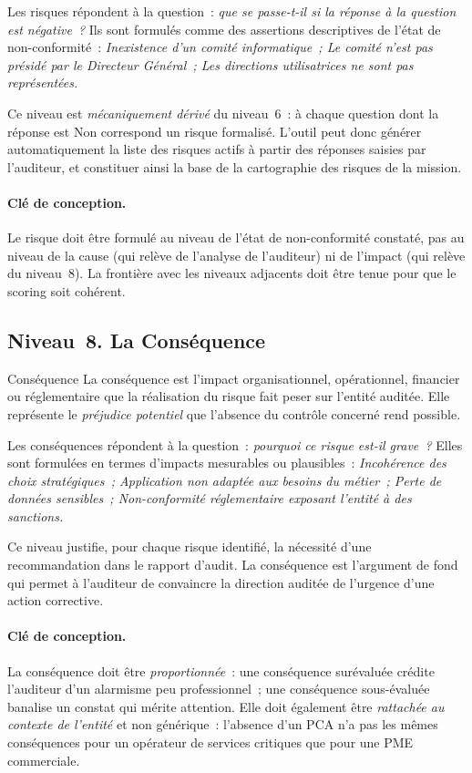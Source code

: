 Les risques répondent à la question~: \emph{que se passe-t-il si la réponse à
la question est négative~?} Ils sont formulés comme des assertions descriptives
de l'état de non-conformité~: \emph{Inexistence d'un comité informatique~; Le
comité n'est pas présidé par le Directeur Général~; Les directions utilisatrices
ne sont pas représentées.}

Ce niveau est \emph{mécaniquement dérivé} du niveau~6~: à chaque question dont
la réponse est Non correspond un risque formalisé. L'outil peut donc générer
automatiquement la liste des risques actifs à partir des réponses saisies par
l'auditeur, et constituer ainsi la base de la cartographie des risques de la
mission.

\paragraph{Clé de conception.}
Le risque doit être formulé au niveau de l'état de non-conformité constaté, pas
au niveau de la cause (qui relève de l'analyse de l'auditeur) ni de l'impact
(qui relève du niveau~8). La frontière avec les niveaux adjacents doit être
tenue pour que le scoring soit cohérent.

\subsection{Niveau~8. La Conséquence}

\begin{boxdef}{Conséquence}
La conséquence est l'impact organisationnel, opérationnel, financier ou
réglementaire que la réalisation du risque fait peser sur l'entité auditée.
Elle représente le \emph{préjudice potentiel} que l'absence du contrôle
concerné rend possible.
\end{boxdef}

Les conséquences répondent à la question~: \emph{pourquoi ce risque est-il
grave~?} Elles sont formulées en termes d'impacts mesurables ou plausibles~:
\emph{Incohérence des choix stratégiques~; Application non adaptée aux besoins
du métier~; Perte de données sensibles~; Non-conformité réglementaire exposant
l'entité à des sanctions.}

Ce niveau justifie, pour chaque risque identifié, la nécessité d'une
recommandation dans le rapport d'audit. La conséquence est l'argument de fond
qui permet à l'auditeur de convaincre la direction auditée de l'urgence d'une
action corrective.

\paragraph{Clé de conception.}
La conséquence doit être \emph{proportionnée}~: une conséquence surévaluée
crédite l'auditeur d'un alarmisme peu professionnel~; une conséquence
sous-évaluée banalise un constat qui mérite attention. Elle doit également être
\emph{rattachée au contexte de l'entité} et non générique~: l'absence d'un PCA
n'a pas les mêmes conséquences pour un opérateur de services critiques que pour
une PME commerciale.

